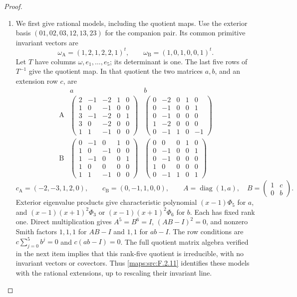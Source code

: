 \documentclass[11pt,a4paper]{article}
\numberwithin{equation}{section}
\theoremstyle{definition}
\begin{document}
\begin{proof}
\begin{enumerate}[label=\arabic*.]
\item We first give rational models, including the quotient
maps.  Use the exterior basis $(01,02,03,12,13,23)$ for the companion
pair.  Its common primitive invariant vectors are
\[
 \omega_{\mathrm A}=(1,2,1,2,2,1)^t,\qquad
 \omega_{\mathrm B}=(1,0,1,0,0,1)^t.
\]
Let $T$ have columns $\omega,e_1,\ldots,e_5$; its determinant is one.
The last five rows of $T^{-1}$ give the quotient map.  In that
quotient the two matrices $a,b$, and an extension row $c$, are
\[
\begin{array}{c|c|c}
 &a&b\\\hline
\mathrm A&
\begin{pmatrix}2&-1&-2&1&0\\1&0&-1&0&0\\3&-1&-2&0&1\\
3&0&-2&0&0\\1&1&-1&0&0\end{pmatrix}&
\begin{pmatrix}0&-2&0&1&0\\0&-1&0&0&1\\0&-1&0&0&0\\
1&-2&0&0&0\\0&-1&1&0&-1\end{pmatrix}\\[3pt]
\mathrm B&
\begin{pmatrix}0&-1&0&1&0\\1&0&-1&0&0\\1&-1&0&0&1\\
1&0&0&0&0\\1&1&-1&0&0\end{pmatrix}&
\begin{pmatrix}0&0&0&1&0\\0&-1&0&0&1\\0&-1&0&0&0\\
1&0&0&0&0\\0&-1&1&0&1\end{pmatrix}
\end{array}
\]
\[
 c_{\mathrm A}=(-2,-3,1,2,0),\qquad
 c_{\mathrm B}=(0,-1,1,0,0),\qquad
 A=\operatorname{diag}(1,a),\quad
 B=\begin{pmatrix}1&c\\0&b\end{pmatrix}.
\]
Exterior eigenvalue products give characteristic polynomial
$(x-1)\Phi _5$ for $a$, and $(x-1)(x+1)^2\Phi _3$ or
$(x-1)(x+1)^2\Phi _6$ for $b$.  Each has fixed rank one.
Direct multiplication gives $A^5=B^6=I$, $(AB-I)^2=0$, and
nonzero Smith factors $1,1,1$ for $AB-I$ and $1,1$ for $ab-I$.
The row conditions are $c\sum_{j=0}^5b^j=0$ and $c(ab-I)=0$.
The full quotient matrix algebra verified in the next item implies
that this rank-five quotient is irreducible, with no invariant
vectors or covectors.  Thus \cref{maps:src:F.2.11} identifies these
models with the rational extensions, up to rescaling
their invariant line.


\end{enumerate}
\end{proof}
\end{document}
